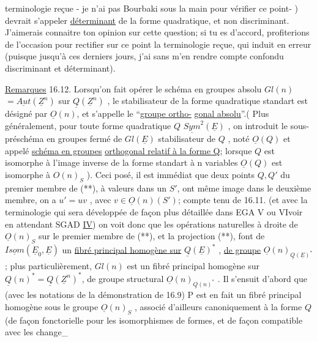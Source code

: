 
terminologie reçue  - je n'ai pas Bourbaki sous la main pour vérifier ce
point- ) devrait s'appeler \uline{déterminant} de la forme quadratique, et non
discriminant. J'aimerais connaitre ton opinion sur cette question; si
tu es d'accord,  profiterions de l'occasion pour rectifier sur ce
point la terminologie reçue, qui induit en erreur (puisque jusqu'à ces
derniers jours, j'ai sans m'en rendre compte confondu discriminant et
déterminant).

\uline{Remarques} 16.12. Lorsqu'on fait opérer le schéma en groupes absolu
$Gl(n)$  $= \underline{Aut}(\underline{Z}^n )$ sur $\underline{Q}(\underline{Z}^n)$ , le stabilisateur de la forme
quadratique standart est désigné par $\underline{O}(n)$, et s'appelle le ``\uline{groupe ortho-}%
\uline{gonal absolu}''.( Plus généralement, pour toute forme quadratique $Q$ \hand{$\in$}
 $\underline{Sym}^2(\underline{E})$ , on introduit le sous-préschéma en groupes fermé de
$Gl(\underline{E})$  stabilisateur de $Q$ , noté $\underline{O}(Q)$ et appelé \uline{schéma en groupes}
\uline{orthogonal relatif à la forme Q}; lorsque $Q$ est isomorphe à l'image
inverse de la forme standart à n variables\hand{,} $\underline{O}(Q)$ est isomorphe à $O(n)_S$ ). Ceci posé,
il est immédiat que deux points $Q,Q'$ du premier membre de (**), à valeurs dans
un $S'$, ont même image dans le deuxième membre,  
 on a $u' = uv$ , avec $v \in \underline{O}(n)(S')$; compte tenu de 16.11. (et
avec la terminologie qui sera développée de façon plus détaillée dans
EGA V ou VIvoir en attendant SGAD \uline{IV}) on voit donc que les opérations naturelles à droite de
$\underline{O}(n)_S$ sur le premier membre de (**), et la projection (**), font de
$\underline{Isom}(\underline{E}_0,\underline{E})$ un \uline{fibré principal homogène sur} $\underline{Q}(\underline{E})^*$ , \uline{de groupe} $\underline{O}(n)_{\underline{Q}(\underline{E})^*}$ ;
plus particulièrement,  $Gl(n)$ est un fibré principal
homogène sur $\underline{Q}(n)^* = \underline{Q}(\underline{Z}^n)^*$, de groupe structural $\underline{O}(n)_{\underline{Q}(n)^*}$ . Il
s'ensuit  d'abord que (avec les notations de la démonstration de 16.9)
P est en fait un fibré principal homogène sous le groupe $\underline{O}(n)_S$ , associé
 d'ailleurs canoniquement à la forme $Q$ (de façon fonctorielle
pour les isomorphismes de formes, et de façon compatible avec les change\_%

